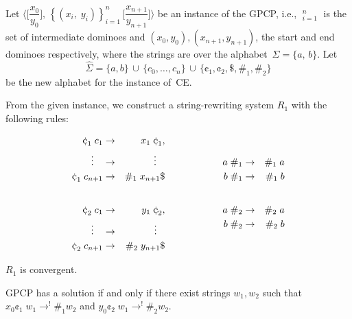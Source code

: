 \documentclass{lmcs} %
\theoremstyle{plain}\newtheorem{satz}[thm]{Satz} %
\begin{document}
\begin{appendices}
Let $\Bigg \langle \bigg[ \dfrac{x_0}{y_0} \bigg], \, \left\{(x_i,\; y_i)\right \}^{n}_{i=1} \,
\bigg[ \dfrac{x_{n+1}}{y_{n+1}} \bigg] \Bigg \rangle$ be an instance of the GPCP, i.e.,
$\mathop{\left\{(x_i,\; y_i)\right \}}^{n}_{i=1}$ is the set of
intermediate dominoes and $(x_0, y_0), (x_{n+1}, y_{n+1})$, the
start and end dominoes respectively, where the strings
are over the alphabet~$\Sigma = \{a,\, b\}$.
Let $$\widehat{\Sigma}= \{a,b\} \, \cup \, \{c_0,\ldots, c_n\} \, \cup \, \{ \cent_1, \cent_2, \$, \#_1, \#_2 \}$$ be
the new alphabet for the instance of~CE.

From the given instance, we construct a string-rewriting system $R_1^{}$ with the following rules:

\begin{equation*}
\begin{aligned}[c]
\cent_1 \;c_1 & \rightarrow & x_1 \;\cent_1, \\
\vdotswithin{\cent_1 \;c_n} & \rightarrow & \vdotswithin{x_n \cent_1}\\
\cent_1 \;c_{n+1} & \rightarrow & \#_1 \;x_{n+1} \$ \\[20pt]
\cent_2 \;c_1 & \rightarrow & y_1 \;\cent_2, \\
\vdotswithin{\cent_2 \;c_n} & \rightarrow & \vdotswithin{y_n \cent_2}\\
\cent_2 \;c_{n+1} & \rightarrow & \#_2 \;y_{n+1} \$
\end{aligned}
\qquad
\qquad
\qquad
\begin{aligned}[c]
a\; \#_1 & \rightarrow & \#_1\; a\\
b\; \#_1 & \rightarrow &  \#_1\; b\\[20pt]
a\; \#_2 & \rightarrow & \#_2\; a\\
b\; \#_2 & \rightarrow &  \#_2\; b\\
\end{aligned}
\end{equation*}

\begin{lem}
$R_1^{}$ is convergent.
\end{lem}

\begin{lem}
GPCP has a solution if and only if there exist strings $w_1, w_2$ such that
$x_0 \cent_1\; w_1 \rightarrow^{!} \#_1 w_2$ and $y_0 \cent_2\; w_1
\rightarrow^{!} \#_2 w_2$.
\end{lem}


\end{appendices}
\end{document}
